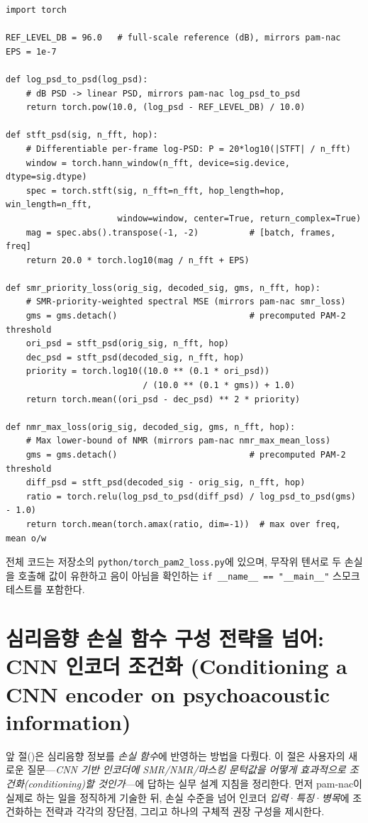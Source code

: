 \documentclass[11pt,a4paper]{article}
\begin{document}
\begin{lstlisting}[style=pythonstyle,caption={torch\_pam2\_loss.py --- PyTorch로 구현한 PAM-2 기반 SMR/NMR 손실 (eq:smrloss, eq:nmrloss)},label={lst:torchpam2}]
import torch

REF_LEVEL_DB = 96.0   # full-scale reference (dB), mirrors pam-nac
EPS = 1e-7

def log_psd_to_psd(log_psd):
    # dB PSD -> linear PSD, mirrors pam-nac log_psd_to_psd
    return torch.pow(10.0, (log_psd - REF_LEVEL_DB) / 10.0)

def stft_psd(sig, n_fft, hop):
    # Differentiable per-frame log-PSD: P = 20*log10(|STFT| / n_fft)
    window = torch.hann_window(n_fft, device=sig.device, dtype=sig.dtype)
    spec = torch.stft(sig, n_fft=n_fft, hop_length=hop, win_length=n_fft,
                      window=window, center=True, return_complex=True)
    mag = spec.abs().transpose(-1, -2)          # [batch, frames, freq]
    return 20.0 * torch.log10(mag / n_fft + EPS)

def smr_priority_loss(orig_sig, decoded_sig, gms, n_fft, hop):
    # SMR-priority-weighted spectral MSE (mirrors pam-nac smr_loss)
    gms = gms.detach()                          # precomputed PAM-2 threshold
    ori_psd = stft_psd(orig_sig, n_fft, hop)
    dec_psd = stft_psd(decoded_sig, n_fft, hop)
    priority = torch.log10((10.0 ** (0.1 * ori_psd))
                           / (10.0 ** (0.1 * gms)) + 1.0)
    return torch.mean((ori_psd - dec_psd) ** 2 * priority)

def nmr_max_loss(orig_sig, decoded_sig, gms, n_fft, hop):
    # Max lower-bound of NMR (mirrors pam-nac nmr_max_mean_loss)
    gms = gms.detach()                          # precomputed PAM-2 threshold
    diff_psd = stft_psd(decoded_sig - orig_sig, n_fft, hop)
    ratio = torch.relu(log_psd_to_psd(diff_psd) / log_psd_to_psd(gms) - 1.0)
    return torch.mean(torch.amax(ratio, dim=-1))  # max over freq, mean o/w
\end{lstlisting}

전체 코드는 저장소의 \texttt{python/torch\_pam2\_loss.py}에 있으며, 무작위
텐서로 두 손실을 호출해 값이 유한하고 음이 아님을 확인하는
\texttt{if \_\_name\_\_ == "\_\_main\_\_"} 스모크 테스트를 포함한다.

\section{심리음향 손실 함수 구성 전략을 넘어: CNN 인코더 조건화 (Conditioning a CNN encoder on psychoacoustic information)}\label{sec:conditioning}
앞 절()은 심리음향 정보를 \emph{손실 함수}에 반영하는 방법을
다뤘다. 이 절은 사용자의 새로운 질문---\emph{CNN 기반 인코더에 SMR/NMR/마스킹
문턱값을 어떻게 효과적으로 조건화(conditioning)할 것인가}---에 답하는 실무 설계
지침을 정리한다. 먼저 pam-nac이 실제로 하는 일을 정직하게 기술한 뒤, 손실 수준을
넘어 인코더 \emph{입력}·\emph{특징}·\emph{병목}에 조건화하는 전략과 각각의
장단점, 그리고 하나의 구체적 권장 구성을 제시한다.
\end{document}
